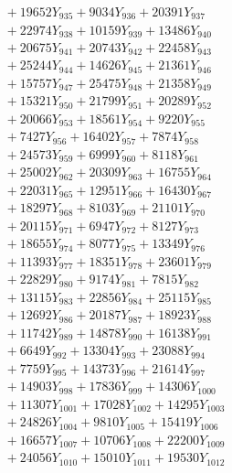 \documentclass[a4paper,10pt]{article}
\begin{document}
{\begin{align}
&\;  + 19652 Y_{935} + 9034 Y_{936} + 20391 Y_{937} \\[0.3ex]
&\;  + 22974 Y_{938} + 10159 Y_{939} + 13486 Y_{940} \\[0.3ex]
&\;  + 20675 Y_{941} + 20743 Y_{942} + 22458 Y_{943} \\[0.3ex]
&\;  + 25244 Y_{944} + 14626 Y_{945} + 21361 Y_{946} \\[0.3ex]
&\;  + 15757 Y_{947} + 25475 Y_{948} + 21358 Y_{949} \\[0.3ex]
&\;  + 15321 Y_{950} + 21799 Y_{951} + 20289 Y_{952} \\[0.3ex]
&\;  + 20066 Y_{953} + 18561 Y_{954} + 9220 Y_{955} \\[0.3ex]
&\;  + 7427 Y_{956} + 16402 Y_{957} + 7874 Y_{958} \\[0.5ex]\allowbreak
&\;  + 24573 Y_{959} + 6999 Y_{960} + 8118 Y_{961} \\[0.3ex]
&\;  + 25002 Y_{962} + 20309 Y_{963} + 16755 Y_{964} \\[0.3ex]
&\;  + 22031 Y_{965} + 12951 Y_{966} + 16430 Y_{967} \\[0.3ex]
&\;  + 18297 Y_{968} + 8103 Y_{969} + 21101 Y_{970} \\[0.3ex]
&\;  + 20115 Y_{971} + 6947 Y_{972} + 8127 Y_{973} \\[0.3ex]
&\;  + 18655 Y_{974} + 8077 Y_{975} + 13349 Y_{976} \\[0.3ex]
&\;  + 11393 Y_{977} + 18351 Y_{978} + 23601 Y_{979} \\[0.3ex]
&\;  + 22829 Y_{980} + 9174 Y_{981} + 7815 Y_{982} \\[0.3ex]
&\;  + 13115 Y_{983} + 22856 Y_{984} + 25115 Y_{985} \\[0.3ex]
&\;  + 12692 Y_{986} + 20187 Y_{987} + 18923 Y_{988} \\[0.5ex]\allowbreak
&\;  + 11742 Y_{989} + 14878 Y_{990} + 16138 Y_{991} \\[0.3ex]
&\;  + 6649 Y_{992} + 13304 Y_{993} + 23088 Y_{994} \\[0.3ex]
&\;  + 7759 Y_{995} + 14373 Y_{996} + 21614 Y_{997} \\[0.3ex]
&\;  + 14903 Y_{998} + 17836 Y_{999} + 14306 Y_{1000} \\[0.3ex]
&\;  + 11307 Y_{1001} + 17028 Y_{1002} + 14295 Y_{1003} \\[0.3ex]
&\;  + 24826 Y_{1004} + 9810 Y_{1005} + 15419 Y_{1006} \\[0.3ex]
&\;  + 16657 Y_{1007} + 10706 Y_{1008} + 22200 Y_{1009} \\[0.3ex]
&\;  + 24056 Y_{1010} + 15010 Y_{1011} + 19530 Y_{1012} \\[0.3ex]

\end{align}}
\end{document}
